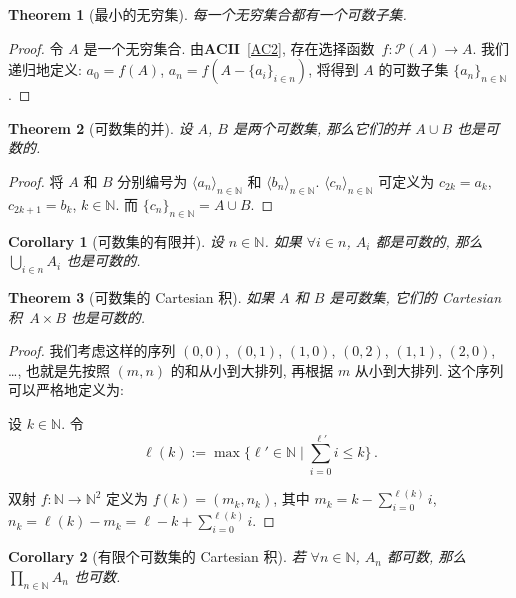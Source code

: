 \documentclass[openany]{ctexbook}
\theoremstyle{plain}
\newtheorem{theorem}{Theorem}[section] %
\newtheorem{corollary}{Corollary} %
\theoremstyle{definition}
\newcommand*{\properclass}[1]{\mathbf{#1}}
\begin{document}
\begin{theorem}[最小的无穷集]\label{theorem: 最小的无穷集}
	每一个无穷集合都有一个可数子集.
\end{theorem}
\begin{proof}
	令 $A$ 是一个无穷集合. 由$\properclass{AC II}$~\ref{AC2}, 存在选择函数~$f \colon \mathscr P(A) \to A$.
	我们递归地定义: $a_0 = f(A)$, $a_n = f(A - \{a_i\}_{i \in n})$, 将得到 $A$ 的可数子集 $\{a_n\}_{n \in \mathbb N}$.
\end{proof}

\begin{theorem}[可数集的并]
	设 $A$, $B$ 是两个可数集, 那么它们的并 $A \cup B$ 也是可数的.
\end{theorem}
\begin{proof}
	将 $A$ 和 $B$ 分别编号为 $\langle a_n \rangle_{n \in \mathbb N}$ 和 $\langle b_n \rangle_{n \in \mathbb N}$. 
	$\langle c_n \rangle_{n \in \mathbb N}$ 可定义为 $c_{2k} = a_k$, $c_{2k + 1} = b_k$, $k \in \mathbb N$. 而 $\{c_n\}_{n \in \mathbb N} = A \cup B$. 
\end{proof}

\begin{corollary}[可数集的有限并]
	设 $n \in \mathbb N$. 
	如果 $\forall i \in n$, $A_i$ 都是可数的, 那么 $\bigcup_{i \in n} A_i$ 也是可数的.
\end{corollary}

\begin{theorem}[可数集的 Cartesian 积]\label{theorem: 可数集的 Cartesian 积}
	如果 $A$ 和 $B$ 是可数集, 它们的 Cartesian 积~$A \times B$ 也是可数的.
\end{theorem}
\begin{proof}
	我们考虑这样的序列 $(0, 0)$, $(0, 1)$, $(1, 0)$, $(0, 2)$, $(1, 1)$, $(2, 0)$, \ldots, 也就是先按照 $(m, n)$ 的和从小到大排列, 再根据 $m$ 从小到大排列. 这个序列可以严格地定义为: 

	设 $k \in \mathbb N$. 
	令
	\begin{equation*}
		\ell(k) := \max \{ \ell' \in \mathbb N \mid \sum_{i = 0}^{\ell'} i \leq k\}\,.
	\end{equation*}
	
	双射 $f \colon \mathbb N \to \mathbb N^2$ 定义为 $f(k) = (m_k, n_k)$, 其中 $m_k = k - \sum_{i = 0}^{\ell(k)} i  $, $n_k = \ell(k) - m_k = \ell - k + \sum_{i = 0}^{\ell(k)} i$.
\end{proof}

\begin{corollary}[有限个可数集的 Cartesian 积]\label{corollary: 有限个可数集的 Cartesian 积}
	若 $\forall n \in \mathbb N$, $A_n$ 都可数, 那么 $\prod_{n \in \mathbb N} A_n$ 也可数. 
\end{corollary}
\end{document}
